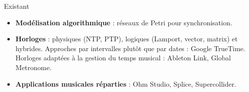 \begin{block}{Existant}
	\begin{itemize}
		\item \textbf{Modélisation algorithmique} : réseaux de Petri pour synchronisation. 
		\item \textbf{Horloges} : physiques (NTP, PTP), logiques (Lamport, vector, matrix) et hybrides.
		Approches par intervalles plutôt que par dates : Google TrueTime.
		Horloges adaptées à la gestion du temps musical : Ableton Link, Global Metronome.
		\item 
		\textbf{Applications musicales réparties} : Ohm Studio, Splice, Supercollider.
	\end{itemize}
\end{block}